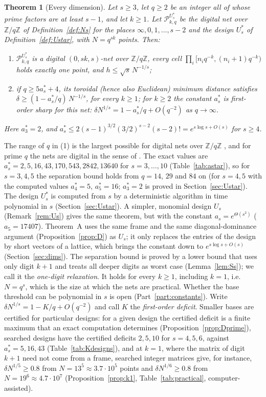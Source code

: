 \documentclass[11pt]{amsart}
\theoremstyle{definition}
\theoremstyle{plain}
\newtheorem{theoremA}{Theorem}
\newcommand{\Z}{\mathbb{Z}}
\begin{document}
\begin{theoremA}[Every dimension]\label{thm:A}
Let $s\ge3$, let $q\ge2$ be an integer all of whose prime factors are at least $s-1$, and let $k\ge1$. Let $\mathcal P^{U^*_s}_{k,q}$ be the digital net over $\Z/q\Z$ of Definition~\ref{def:Ns} for the places $\infty,0,1,\dots,s-2$ and the design $U^*_s$ of Definition~\ref{def:Ustar}, with $N=q^{sk}$ points. Then:
\begin{enumerate}
\item $\mathcal P^{U^*_s}_{k,q}$ is a digital $(0,sk,s)$-net over $\Z/q\Z$, every cell $\prod_i[n_iq^{-k},(n_i+1)q^{-k})$ holds exactly one point, and $h\le\sqrt s\,N^{-1/s}$;
\item if $q\ge5a^*_s+4$, its toroidal (hence also Euclidean) minimum distance satisfies $\delta\ge(1-a^*_s/q)\,N^{-1/s}$, for every $k\ge1$; for $k\ge2$ the constant $a^*_s$ is first-order sharp for this net: $\delta N^{1/s}=1-a^*_s/q+O(q^{-2})$ as $q\to\infty$.
\end{enumerate}
Here $a^*_3=2$, and $a^*_s\le2(s-1)^{3/2}(3/2)^{s-2}(s-2)!=e^{s\log s+O(s)}$ for $s\ge4$.
\end{theoremA}

The range of $q$ in (1) is the largest possible for digital nets over $\Z/q\Z$ \cite[Cor.~2]{LNS96}, and for prime $q$ the nets are digital in the sense of \cite{DGS2}. The exact values are $a^*_s=2,5,16,43,170,543,2842,13640$ for $s=3,\dots,10$ (Table~\ref{tab:astar}), so for $s=3,4,5$ the separation bound holds from $q=14$, $29$ and $84$ on (for $s=4,5$ with the computed values $a^*_4=5$, $a^*_5=16$; $a^*_3=2$ is proved in Section~\ref{sec:Ustar}). The design $U^*_s$ is computed from $s$ by a deterministic algorithm in time polynomial in $s$ (Section~\ref{sec:Ustar}). A simpler, monomial design $U_s$ (Remark~\ref{rem:Us}) gives the same theorem, but with the constant $a_s=e^{\Theta(s^2)}$ ($a_5=17407$). Theorem~A uses the same frame and the same diagonal-dominance argument (Proposition~\ref{prop:D}) as $U_s$; it only replaces the entries of the design by short vectors of a lattice, which brings the constant down to $e^{s\log s+O(s)}$ (Section~\ref{sec:dims}). The separation bound is proved by a lower bound that uses only digit $k+1$ and treats all deeper digits as worst case (Lemma~\ref{lem:Ss}); we call it the \emph{one-digit relaxation}. It holds for every $k\ge1$, including $k=1$, i.e.\ $N=q^s$, which is the size at which the nets are practical. Whether the base threshold can be polynomial in $s$ is open (Part~\ref{part:constants}). Write $\delta N^{1/s}=1-K/q+O(q^{-2})$ and call $K$ the \emph{first-order deficit}. Smaller bases are certified for particular designs: for a given design the certified deficit is a finite maximum that an exact computation determines (Proposition~\ref{prop:Dprime}), searched designs have the certified deficits $2,5,10$ for $s=4,5,6$, against $a^*_s=5,16,43$ (Table~\ref{tab:Kdesigns}), and at $k=1$, where the matrix of digit $k+1$ need not come from a frame, searched integer matrices give, for instance, $\delta N^{1/5}\ge0.8$ from $N=13^5\approx3.7\cdot10^5$ points and $\delta N^{1/6}\ge0.8$ from $N=19^6\approx4.7\cdot10^7$ (Proposition~\ref{prop:k1}, Table~\ref{tab:practical}, computer-assisted).
\end{document}

